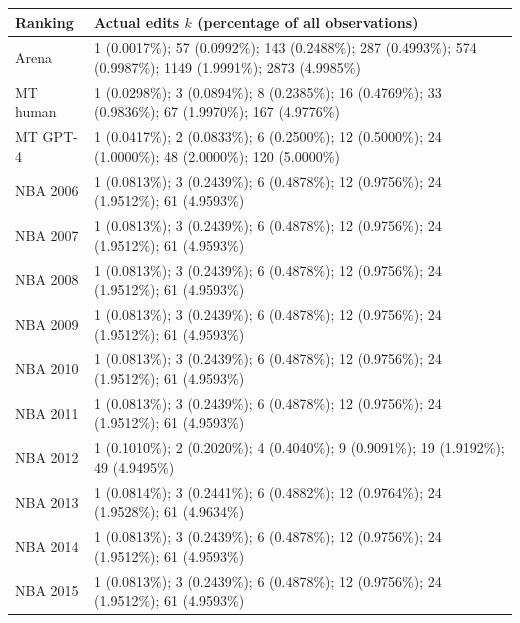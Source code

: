 \begin{tabular}{lp{4.1in}}
\toprule
Ranking & Actual edits $k$ (percentage of all observations) \\
\midrule
Arena & 1 (0.0017\%); 57 (0.0992\%); 143 (0.2488\%); 287 (0.4993\%); 574 (0.9987\%); 1149 (1.9991\%); 2873 (4.9985\%) \\
MT human & 1 (0.0298\%); 3 (0.0894\%); 8 (0.2385\%); 16 (0.4769\%); 33 (0.9836\%); 67 (1.9970\%); 167 (4.9776\%) \\
MT GPT-4 & 1 (0.0417\%); 2 (0.0833\%); 6 (0.2500\%); 12 (0.5000\%); 24 (1.0000\%); 48 (2.0000\%); 120 (5.0000\%) \\
NBA 2006 & 1 (0.0813\%); 3 (0.2439\%); 6 (0.4878\%); 12 (0.9756\%); 24 (1.9512\%); 61 (4.9593\%) \\
NBA 2007 & 1 (0.0813\%); 3 (0.2439\%); 6 (0.4878\%); 12 (0.9756\%); 24 (1.9512\%); 61 (4.9593\%) \\
NBA 2008 & 1 (0.0813\%); 3 (0.2439\%); 6 (0.4878\%); 12 (0.9756\%); 24 (1.9512\%); 61 (4.9593\%) \\
NBA 2009 & 1 (0.0813\%); 3 (0.2439\%); 6 (0.4878\%); 12 (0.9756\%); 24 (1.9512\%); 61 (4.9593\%) \\
NBA 2010 & 1 (0.0813\%); 3 (0.2439\%); 6 (0.4878\%); 12 (0.9756\%); 24 (1.9512\%); 61 (4.9593\%) \\
NBA 2011 & 1 (0.0813\%); 3 (0.2439\%); 6 (0.4878\%); 12 (0.9756\%); 24 (1.9512\%); 61 (4.9593\%) \\
NBA 2012 & 1 (0.1010\%); 2 (0.2020\%); 4 (0.4040\%); 9 (0.9091\%); 19 (1.9192\%); 49 (4.9495\%) \\
NBA 2013 & 1 (0.0814\%); 3 (0.2441\%); 6 (0.4882\%); 12 (0.9764\%); 24 (1.9528\%); 61 (4.9634\%) \\
NBA 2014 & 1 (0.0813\%); 3 (0.2439\%); 6 (0.4878\%); 12 (0.9756\%); 24 (1.9512\%); 61 (4.9593\%) \\
NBA 2015 & 1 (0.0813\%); 3 (0.2439\%); 6 (0.4878\%); 12 (0.9756\%); 24 (1.9512\%); 61 (4.9593\%) \\
\bottomrule
\end{tabular}
